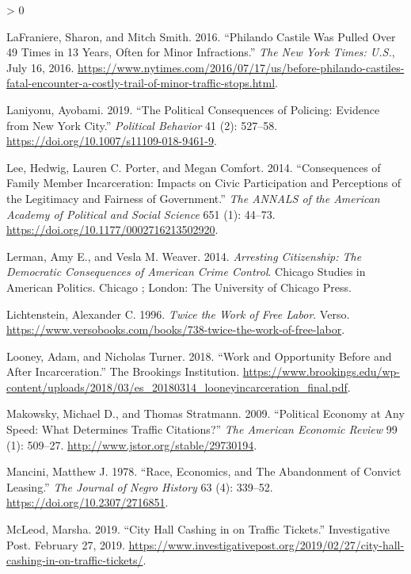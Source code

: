 \documentclass[
  12pt,
]{article}
\newlength{\cslhangindent}
\newenvironment{CSLReferences}[2] %
 {%
  \setlength{\parindent}{0pt}
  \ifodd #1 \everypar{\setlength{\hangindent}{\cslhangindent}}\ignorespaces\fi
  \ifnum #2 > 0
  \setlength{\parskip}{#2\baselineskip}
  \fi
 }%
 {}
\begin{document}
\begin{CSLReferences}{1}{0}
\leavevmode\hypertarget{ref-LaFraniere2016}{}%
LaFraniere, Sharon, and Mitch Smith. 2016. {``Philando {Castile Was Pulled Over} 49 {Times} in 13 {Years}, {Often} for {Minor Infractions}.''} \emph{The New York Times: U.S.}, July 16, 2016. \url{https://www.nytimes.com/2016/07/17/us/before-philando-castiles-fatal-encounter-a-costly-trail-of-minor-traffic-stops.html}.

\leavevmode\hypertarget{ref-Laniyonu2019}{}%
Laniyonu, Ayobami. 2019. {``The {Political Consequences} of {Policing}: {Evidence} from {New York City}.''} \emph{Political Behavior} 41 (2): 527--58. \url{https://doi.org/10.1007/s11109-018-9461-9}.

\leavevmode\hypertarget{ref-Lee2014}{}%
Lee, Hedwig, Lauren C. Porter, and Megan Comfort. 2014. {``Consequences of {Family Member Incarceration}: {Impacts} on {Civic Participation} and {Perceptions} of the {Legitimacy} and {Fairness} of {Government}.''} \emph{The ANNALS of the American Academy of Political and Social Science} 651 (1): 44--73. \url{https://doi.org/10.1177/0002716213502920}.

\leavevmode\hypertarget{ref-Lerman2014}{}%
Lerman, Amy E., and Vesla M. Weaver. 2014. \emph{Arresting Citizenship: The Democratic Consequences of {American} Crime Control}. Chicago Studies in {American} Politics. {Chicago ; London}: {The University of Chicago Press}.

\leavevmode\hypertarget{ref-Lichtenstein1996}{}%
Lichtenstein, Alexander C. 1996. \emph{Twice the {Work} of {Free Labor}}. {Verso}. \url{https://www.versobooks.com/books/738-twice-the-work-of-free-labor}.

\leavevmode\hypertarget{ref-Looney2018}{}%
Looney, Adam, and Nicholas Turner. 2018. {``Work and Opportunity Before and After Incarceration.''} {The Brookings Institution}. \url{https://www.brookings.edu/wp-content/uploads/2018/03/es_20180314_looneyincarceration_final.pdf}.

\leavevmode\hypertarget{ref-Makowsky2009}{}%
Makowsky, Michael D., and Thomas Stratmann. 2009. {``Political {Economy} at {Any Speed}: {What Determines Traffic Citations}?''} \emph{The American Economic Review} 99 (1): 509--27. \url{http://www.jstor.org/stable/29730194}.

\leavevmode\hypertarget{ref-Mancini1978}{}%
Mancini, Matthew J. 1978. {``Race, {Economics}, and {The Abandonment} of {Convict Leasing}.''} \emph{The Journal of Negro History} 63 (4): 339--52. \url{https://doi.org/10.2307/2716851}.

\leavevmode\hypertarget{ref-McLeod2019}{}%
McLeod, Marsha. 2019. {``City {Hall} Cashing in on Traffic Tickets.''} {Investigative Post}. February 27, 2019. \url{https://www.investigativepost.org/2019/02/27/city-hall-cashing-in-on-traffic-tickets/}.


\end{CSLReferences}
\end{document}
